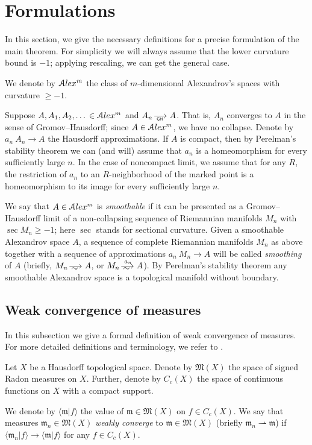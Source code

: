 \section{Formulations}

In this section, we give the necessary definitions for a precise formulation of the main theorem.
For simplicity  we will always assume that the lower
curvature bound is  $-1$;
applying rescaling, we can get the general case.

We denote by
$\mathcal{A}lex^m$ the class of $m$-dimensional Alexandrov's spaces
with curvature $\ge -1$.

Suppose $A,A_1,A_2,\dots{} \in \mathcal{A}lex^m$ and $A_n\GHto A$.
That is, $A_n$ converges to 
$A$ in the sense of Gromov--Hausdorff;
since $A\in \mathcal{A}lex^m$, we have no collapse.
Denote by $a_n\:A_n\to A$ the Hausdorff approximations.
If $A$ is compact, then
by Perelman's stability theorem \cite{PerStab,KapStab} we can (and will) assume that $a_n$ is a homeomorphism for every sufficiently large $n$.
In the case of noncompact limit, we assume that for any $R$, the restriction of $a_n$ to an $R$-neighborhood of the marked point is a homeomorphism to its image for every sufficiently large $n$.

We say that $A\in \mathcal{A}lex^m$ is \emph{smoothable}
if it can be presented as a Gromov--Hausdorff limit of a non-collapsing sequence of Riemannian manifolds $M_n$ with $\sec M_n\ge-1$; here $\sec$ stands for sectional curvature.
Given a smoothable Alexandrov space $A$,
a sequence of complete Riemannian manifolds $M_n$ as above together with a sequence of approximations $a_n\:M_n\to A$
will be called \emph{smoothing} of $A$
(briefly, $M_n\smooths{} A$, or $M_n\smooths{a_n} A$).
By Perelman's stability theorem any smoothable Alexandrov space is a topological manifold without boundary.

\subsection{Weak convergence of measures}

In this subsection we give a formal definition of weak convergence of measures.
For more detailed definitions and terminology, we refer to
\cite{GMS}.

Let $X$ be a Hausdorff topological space.
Denote by $\mathfrak M(X)$ the space of signed Radon measures on $X$.
Further, denote by $C_c(X)$  the space of continuous functions on $X$
with a compact support. 

We  denote by $\langle \mathfrak m|f\rangle $ the value of $\mathfrak m\in\mathfrak M(X)$ on $f\in C_c(X)$.
We say that measures $\mathfrak m_n\in \mathfrak M(X)$ \emph{weakly converge} to $\mathfrak m\in \mathfrak M(X)$ (briefly
$\mathfrak m_n\rightharpoonup \mathfrak m$) if $\langle \mathfrak m_n|f\rangle \to \langle \mathfrak m|f\rangle $ for any $f\in C_c(X)$.


